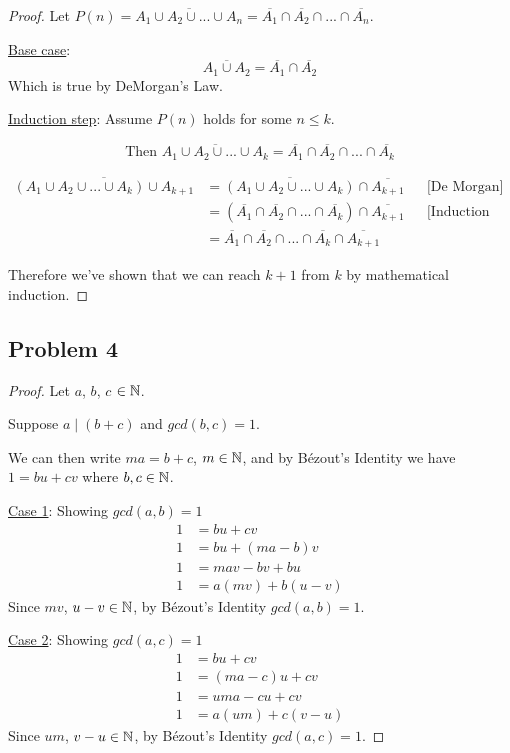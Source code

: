 \documentclass[10pt]{article}
\begin{document}
\begin{proof}
  Let $P(n) = \overline{A_{1} \cup A_{2} \cup ... \cup A_{n}} = \overline{A_{1}}
  \cap \overline{A_{2}} \cap ... \cap \overline{A_{n}}$.
  \spacing

  \noindent
  \underline{Base case}:
  $$\overline{A_{1} \cup A_{2}} = \overline{A_{1}} \cap \overline{A_{2}}$$
  Which is true by DeMorgan's Law.
  \spacing

  \noindent
  \underline{Induction step}:
  Assume $P(n)$ holds for some $n \le k$.

  $$\text{Then } \overline{A_{1} \cup A_{2} \cup ... \cup A_{k}} =
  \overline{A_{1}} \cap \overline{A_{2}} \cap ... \cap \overline{A_{k}}$$

  \begin{align*}
  \overline{(A_{1} \cup A_{2} \cup ... \cup A_{k}) \cup A_{k + 1}} &=
  \overline{(A_{1} \cup A_{2} \cup ... \cup A_{k})} \cap \overline{A_{k+1}} && \text{[De Morgan]}\\
    &= (\overline{A_{1}} \cap \overline{A_{2}} \cap ... \cap \overline{A_{k}})
      \cap \overline{A_{k + 1}} && \text{[Induction Hypothesis]} \\
    &= \overline{A_{1}} \cap \overline{A_{2}} \cap ...
      \cap \overline{A_{k}} \cap \overline{A_{k + 1}}
  \end{align*}

  \noindent
  Therefore we've shown that we can reach $k + 1$ from $k$ by mathematical induction.
\end{proof}

\newpage
\subsection*{Problem 4}

\begin{proof}
  Let $a$, $b$, $c$ $\in \mathbb{N}$.
  \spacing

  \noindent
  Suppose $a \mid (b + c)$ and $gcd(b, c) = 1$.
  \spacing

  \noindent
  We can then write $ma = b + c$, $m \in \mathbb{N}$, and by Bézout's Identity we have $1 = bu + cv$
  where $b, c \in \mathbb{N}$.
  \spacing

  \noindent
  \underline{Case 1}: Showing $gcd(a, b) = 1$
  \begin{align*}
    1 &= bu + cv \\
    1 &= bu + (ma - b)v \\
    1 &= mav - bv + bu \\
    1 &= a(mv) + b(u - v)
  \end{align*}
  Since $mv$, $u - v \in \mathbb{N}$, by Bézout's Identity $gcd(a, b) = 1$.
  \spacing

  \noindent
  \underline{Case 2}: Showing $gcd(a, c) = 1$
  \begin{align*}
    1 &= bu + cv \\
    1 &= (ma - c)u + cv \\
    1 &= uma - cu + cv \\
    1 &= a(um) + c(v - u)
  \end{align*}
  Since $um$, $v - u \in \mathbb{N}$, by Bézout's Identity $gcd(a, c) = 1$.
\end{proof}
\end{document}
